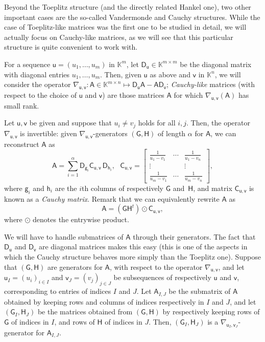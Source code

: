 \documentclass{sig-alternate}
\newcommand{\vg}{\ensuremath{\mathsf{g}}}
\newcommand{\vh}{\ensuremath{\mathsf{h}}}
\newcommand{\vu}{\ensuremath{\mathsf{u}}}
\newcommand{\vv}{\ensuremath{\mathsf{v}}}
\newcommand{\mA}{\ensuremath{\mathsf{A}}}
\newcommand{\mC}{\ensuremath{\mathsf{C}}}
\newcommand{\mD}{\ensuremath{\mathsf{D}}}
\newcommand{\mG}{\ensuremath{\mathsf{G}}}
\newcommand{\mH}{\ensuremath{\mathsf{H}}}
\newcommand{\K}{\ensuremath{\mathbb{K}}}
\begin{document}
\smallskip{}  Beyond the
Toeplitz structure (and the directly related Hankel one), two other
important cases are the so-called Vandermonde and Cauchy
structures. While the case of Toeplitz-like matrices was the first one
to be studied in detail, we will actually focus on Cauchy-like
matrices, as we will see that this particular structure is quite
convenient to work with.

For a sequence $\vu=(u_1,\dots,u_m)$ in $\K^m$, let $\mD_\vu \in
\K^{m\times m}$ be the diagonal matrix with diagonal entries
$u_1,\dots,u_m$. Then, given $\vu$ as above and $\vv$ in $\K^n$, we will
consider the operator $\nabla_{\vu,\vv}: \mA \in \K^{m\times n} \mapsto \mD_\vu
\mA - \mA \mD_\vv$; {\em Cauchy-like} matrices (with respect to the
choice of $\vu$ and $\vv$) are those matrices $\mA$ for which
$\nabla_{\vu,\vv}(\mA)$ has small rank.

Let $\vu,\vv$ be given and suppose that $u_i \ne v_j$ holds for all
$i,j$. Then, the operator $\nabla_{\vu,\vv}$ is invertible: given
$\nabla_{\vu,\vv}$-generators $(\mG,\mH)$ of length $\alpha$ for $\mA$, we can reconstruct $\mA$ as
\begin{equation}\label{eq:recA}
\mA = \sum_{i=1}^\alpha
\mD_{\vg_i} 
\mC_{\vu,\vv}\,\mD_{\vh_i},\ \ \ 
\mC_{\vu,\vv}=\begin{bmatrix}
\frac 1{u_1-v_1} & \cdots & \frac 1{u_1-v_n}\\
\vdots & & \vdots \\
\frac 1{u_m-v_1} & \cdots & \frac 1{u_m-v_n}
\end{bmatrix}, 
\end{equation}
where $\vg_i$ and $\vh_i$ are the $i$th columns of respectively $\mG$
and~$\mH$, and  matrix $\mC_{\vu,\vv}$ is known as a {\em Cauchy
  matrix}. Remark that we can
equivalently rewrite $\mA$ as
\begin{equation}\label{eq:recA2}
\mA= (\mG \mH^t) \odot \mC_{\vu,\vv},
\end{equation}
where $\odot$ denotes the entrywise product.

We will have to handle submatrices of $\mA$ through their
generators. The fact that $\mD_{\vu}$ and $\mD_{\vv}$ are diagonal
matrices makes this easy (this is one of the aspects in which the
Cauchy structure behaves more simply than the Toeplitz one).  Suppose
that $(\mG,\mH)$ are generators for $\mA$, with respect to the
operator $\nabla_{\vu,\vv}$, and let $\vu_I=(u_i)_{i \in I}$ and
$\vv_J=(v_j)_{j \in J}$ be subsequences of respectively $\vu$ and
$\vv$, corresponding to entries of indices $I$ and $J$. Let
$\mA_{I,J}$ be the submatrix of $\mA$ obtained by keeping rows and
columns of indices respectively in $I$ and $J$, and let
$(\mG_I,\mH_J)$ be the matrices obtained from $(\mG,\mH)$ by
respectively keeping rows of $\mG$ of indices in $I$, and rows of
$\mH$ of indices in $J$. Then, $(\mG_I,\mH_J)$ is a
$\nabla_{\vu_I,\vv_J}$-generator for $\mA_{I,J}$.
\end{document}

